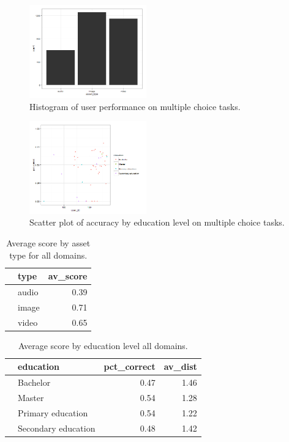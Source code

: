 \documentclass[12pt]{article}
\begin{document}
\begin{figure}[ht!]
\begin{center}
\includegraphics[width=0.45\textwidth]{../../output/demo_analysis/hist_assets.png}
\caption{Histogram of user performance on multiple choice tasks.}
\end{center}	
\end{figure}




\begin{figure}[ht!]
\begin{center}
\includegraphics[width=0.45\textwidth]{../../output/demo_analysis/scatter_edu.png}
\caption{Scatter plot of accuracy by education level on multiple choice tasks.}
\end{center}	
\end{figure}


\begin{table}[ht!]
\centering
\begin{tabular}{rlr}
  \hline
 & type & av\_score \\ 
  \hline
   & audio & 0.39 \\ 
   & image & 0.71 \\ 
   & video & 0.65 \\ 
   \hline
\end{tabular}
\caption{Average score by asset type for all domains.} 
\end{table}


\clearpage
\begin{table}[ht!]
\centering
\begin{tabular}{rlrr}
  \hline
 & education & pct\_correct & av\_dist \\ 
  \hline
  & Bachelor & 0.47 & 1.46 \\ 
  & Master & 0.54 & 1.28 \\ 
  & Primary education & 0.54 & 1.22 \\ 
  & Secondary education & 0.48 & 1.42 \\ 
   \hline
\end{tabular}
\caption{Average score by education level all domains.} 
\end{table}
\end{document}

